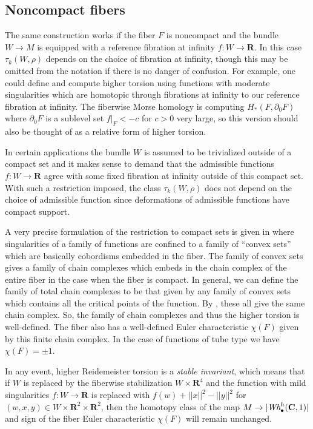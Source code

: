 \documentclass{amsart}
\def\bC{\mathbf{C}}
\def\bR{\mathbf{R}}
\theoremstyle{definition}
\theoremstyle{remark}
\newtheorem{inductive lemma}[theorem]{Inductive Lemma}
\begin{document}



\subsection{Noncompact fibers} %


The same construction works if the fiber $F$ is noncompact and the bundle $W\to M$ is equipped with a reference fibration at infinity $f: W \to \bR$. In this case $\tau_k(W,\rho)$ depends on the choice of fibration at infinity, though this may be omitted from the notation if there is no danger of confusion. For example, one could define and compute higher torsion using functions with moderate singularities which are homotopic through fibrations at infinity to our reference fibration at infinity. The fiberwise Morse homology is computing $H_*(F,\partial_0F)$ where $\partial_0F$ is a sublevel set $f|_F<-c$ for $c>0$ very large, so this version should also be thought of as a relative form of higher torsion.


 In certain applications the bundle $W$ is assumed to be trivialized outside of a compact set and it makes sense to demand that the admissible functions $f:W \to \bR$ agree with some fixed fibration at infinity outside of this compact set. With such a restriction imposed, the class $\tau_k(W,\rho)$ does not depend on the choice of admissible function since deformations of admissible functions have compact support. 
 
 A very precise formulation of the restriction to compact sets is given in \cite[Lemma 3.20]{I02} where singularities of a family of functions are confined to a family of ``convex sets'' which are basically cobordisms embedded in the fiber. The family of convex sets gives a family of chain complexes which embeds in the chain complex of the entire fiber in the case when the fiber is compact. In general, we can define the family of total chain complexes to be that given by any family of convex sets which contains all the critical points of the function. By \cite[Lemma 3.20]{I02}, these all give the same chain complex. So, the family of chain complexes and thus the higher torsion is well-defined. The fiber also has a well-defined Euler characteristic $\chi(F)$ given by this finite chain complex. In the case of functions of tube type we have $\chi(F)=\pm1$.

 In any event, higher Reidemeister torsion is a {\em stable invariant}, which means that if $W$ is replaced by the fiberwise stabilization $W \times \bR^4$ and the function with mild singularities $f:W \to \bR$ is replaced with $f(w)+||x||^2-||y||^2$ for $(w,x,y) \in W \times \bR^2 \times \bR^2$, then the homotopy class of the map $M \to  |\text{\em Wh}_\bullet^h(\bC,1)| $ and sign of the fiber Euler characteristic $\chi(F)$ will remain unchanged. 
 
\end{document}
